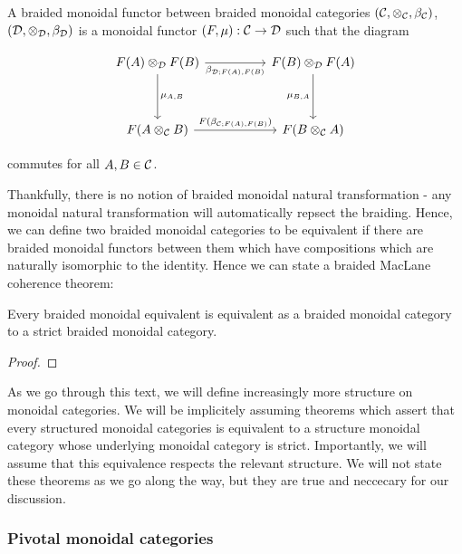 \begin{defn} A braided monoidal functor between braided monoidal categories $({\mathcal C},\otimes_{{\mathcal C}},\beta_{{\mathcal C}})$, $({\mathcal D},\otimes_{{\mathcal D}},\beta_{{\mathcal D}})$ is a monoidal functor $(F,\mu):{\mathcal C}\to {\mathcal D}$ such that the diagram

\[\begin{tikzcd}
	{F(A)\otimes_{\cD}F(B)} && {F(B)\otimes_{\cD}F(A)} \\
	\\
	{F(A\otimes_{\cC}B)} && {F(B\otimes_{\cC}A)}
	\arrow["{\mu_{A,B}}", from=1-1, to=3-1]
	\arrow["{\beta_{\cD;F(A),F(B)}}"', from=1-1, to=1-3]
	\arrow["{\mu_{B,A}}"', from=1-3, to=3-3]
	\arrow["{F(\beta_{\cC;F(A),F(B)})}", from=3-1, to=3-3]
\end{tikzcd}\]

commutes for all $A,B\in {\mathcal C}$.


\end{defn}

Thankfully, there is no notion of braided monoidal natural transformation - any monoidal natural transformation will automatically repsect the braiding. Hence, we can define two braided monoidal categories to be equivalent if there are braided monoidal functors between them which have compositions which are naturally isomorphic to the identity. Hence we can state a braided MacLane coherence theorem:

\begin{thrm} Every braided monoidal equivalent is equivalent as a braided monoidal category to a strict braided monoidal category.
\end{thrm}
\begin{proof}
\end{proof}

As we go through this text, we will define increasingly more structure on monoidal categories. We will be implicitely assuming theorems which assert that every structured monoidal categories is equivalent to a structure monoidal category whose underlying monoidal category is strict. Importantly, we will assume that this equivalence respects the relevant structure. We will not state these theorems as we go along the way, but they are true and neccecary for our discussion. 

\subsubsection{Pivotal monoidal categories}

